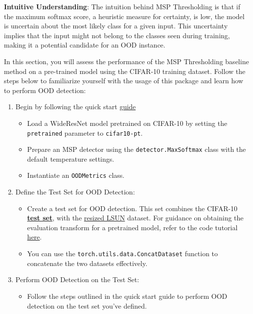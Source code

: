 \documentclass[11pt, oneside]{article}   	%
\begin{document}
\textbf{Intuitive Understanding}: The intuition behind MSP Thresholding is that if the maximum softmax score, a heuristic measure for certainty, is low, the model is uncertain about the most likely class for a given input. This uncertainty implies that the input might not belong to the classes seen during training, making it a potential candidate for an OOD instance.

In this section, you will assess the performance of the MSP Thresholding baseline method on a pre-trained model using the CIFAR-10 training dataset. 
Follow the steps below to familiarize yourself with the usage of this package and learn how to perform OOD detection:
\begin{enumerate}
    \item Begin by following the quick start \href{https://github.com/kkirchheim/pytorch-ood#-quick-start}{guide}
    \begin{itemize}
        \item Load a WideResNet model pretrained on CIFAR-10 by setting the \texttt{pretrained} parameter to \texttt{cifar10-pt}.
        \item Prepare an MSP detector using the \texttt{detector.MaxSoftmax} class with the default temperature settings.
        \item Instantiate an \texttt{OODMetrics} class.
    \end{itemize}
    \item Define the Test Set for OOD Detection:
    \begin{itemize}
        \item Create a test set for OOD detection. This set combines the CIFAR-10 \href{https://pytorch.org/vision/main/generated/torchvision.datasets.CIFAR10.html#torchvision.datasets.CIFAR10}{\textbf{test set}}, with the \href{https://pytorch-ood.readthedocs.io/en/latest/data.html#lsunresize}{resized LSUN} dataset. For guidance on obtaining the evaluation transform for a pretrained model, refer to the code tutorial \href{https://pytorch-ood.readthedocs.io/en/latest/auto_examples/benchmarks/interface/cifar10_odin.html}{here}.
        \item You can use the \texttt{torch.utils.data.ConcatDataset} function to concatenate the two datasets effectively.
    \end{itemize}
    \item Perform OOD Detection on the Test Set:
    \begin{itemize}
        \item Follow the steps outlined in the quick start guide to perform OOD detection on the test set you've defined.

\end{itemize}
\end{enumerate}
\end{document}

